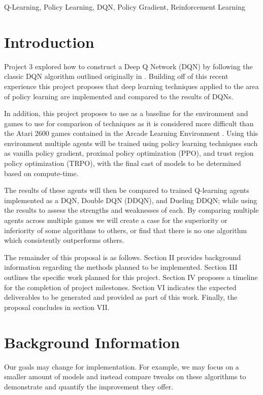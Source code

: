 \documentclass[conference]{IEEEtran}
\begin{document}
\begin{IEEEkeywords}
Q-Learning, Policy Learning, DQN, Policy Gradient, Reinforcement Learning
\end{IEEEkeywords}

\section{Introduction}
Project 3 explored how to construct a Deep Q Network (DQN) by following the classic DQN algorithm outlined originally in \cite{DQNOriginalPaper}.
Building off of this recent experience this project proposes that deep learning techniques applied to the area of policy learning are implemented and compared to the results of DQNs.

In addition, this project proposes to use \cite{bhonker2017playing} as a baseline for the environment and games to use for comparison of techniques as it is considered more difficult than the Atari 2600 games contained in the Arcade Learning Environment \cite{Bellemare_2013}.
Using this environment multiple agents will be trained using policy learning techniques such as vanilla policy gradient, proximal policy optimization (PPO), and trust region policy optimization (TRPO), with the final cast of models to be determined based on compute-time.

The results of these agents will then be compared to trained Q-learning agents implemented as a DQN, Double DQN (DDQN), and Dueling DDQN; while using the results to assess the strengths and weaknesses of each. By comparing multiple agents across multiple games we will create a case for the superiority or inferiority of some algorithms to others, or find that there is no one algorithm which consistently outperforms others.

The remainder of this proposal is as follows.
Section II provides background information regarding the methods planned to be implemented.
Section III outlines the specific work planned for this project.
Section IV proposes a timeline for the completion of project milestones.
Section VI indicates the expected deliverables to be generated and provided as part of this work.
Finally, the proposal concludes in section VII.

\section{Background Information}
Our goals may change for implementation. For example, we may focus on a smaller amount of models and instead compare tweaks on these algorithms to demonstrate and quantify the improvement they offer.
\end{document}
